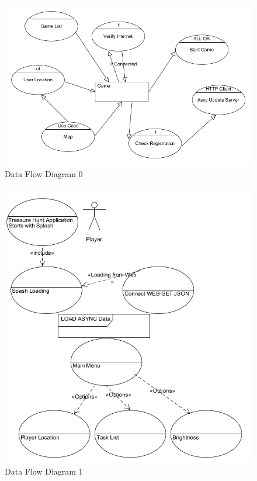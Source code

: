\documentclass[11.4pt,a4paper,times]{report}
\begin{document}
\begin{figure}[ht!]
\left
\includegraphics[width=150mm]{images/dfd0}
\caption{Data Flow Diagram 0}
\label{overflow}
\end{figure}
\newpage

\begin{figure}[ht!]
\left
\includegraphics[width=150mm]{dfd0}
\caption{Data Flow Diagram 1}
\label{overflow}
\end{figure}
\newpage
\end{document}
